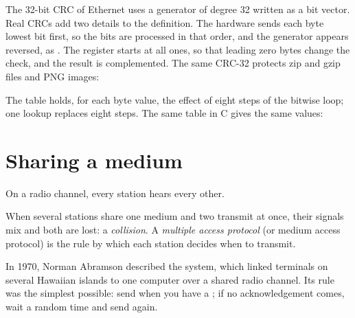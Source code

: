 The 32-bit CRC of Ethernet uses a generator of degree 32 written  as a bit vector. Real CRCs add two
details to the definition. The hardware sends each byte lowest bit first, so the bits are processed in that order,
and the generator appears reversed, as . The register starts at all ones, so that leading zero bytes
change the check, and the result is complemented. The same CRC-32 protects zip and gzip files and PNG images:

\label{lst:b2:link-layer:crc32}


The table holds, for each byte value, the effect of eight steps of the bitwise loop; one lookup replaces eight steps.
The same table in C gives the same values:



\section{Sharing a medium}\label{sec:b2:link-layer:sharing}

On a radio channel, every station hears every other.

\begin{definition}\label{def:b2:link-layer:mac-protocol}
When several stations share one medium and two transmit at once, their signals mix and both  are lost: a
\emph{collision}. A \emph{multiple access protocol} (or medium
access protocol) is the rule by which each station decides when to transmit.
\end{definition}

\begin{history}
In 1970, Norman Abramson described the  system, which linked terminals on several Hawaiian islands to one
computer over a shared radio channel. Its rule was the simplest possible: send when you have a ; if no
acknowledgement comes, wait a random time and send again.
\end{history}

